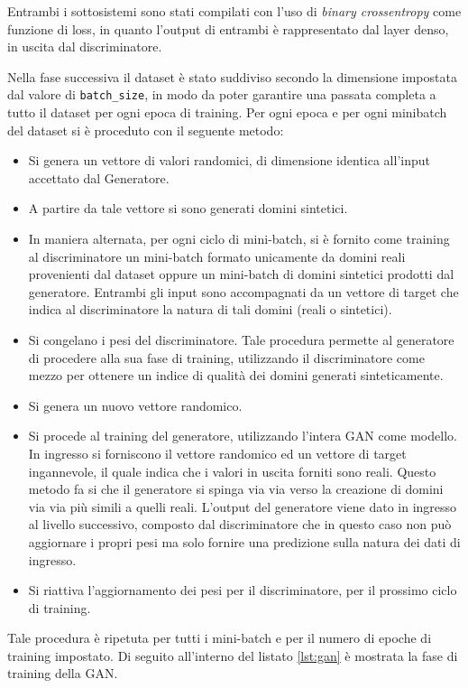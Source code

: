 Entrambi i sottosistemi sono stati compilati con l'uso di \textit{binary crossentropy} come funzione di loss, in quanto l'output di entrambi è rappresentato dal layer denso, in uscita dal discriminatore.

Nella fase successiva il dataset è stato suddiviso secondo la dimensione impostata dal valore di \lstinline!batch_size!, in modo da poter garantire una passata completa a tutto il dataset per ogni epoca di training.
Per ogni epoca e per ogni minibatch del dataset si è proceduto con il seguente metodo: 
\begin{itemize}
	\item Si genera un vettore di valori randomici, di dimensione identica all'input accettato dal Generatore. 
	\item A partire da tale vettore si sono generati domini sintetici.
	\item In maniera alternata, per ogni ciclo di mini-batch, si è fornito come training al discriminatore un mini-batch formato unicamente da domini reali provenienti dal dataset oppure un mini-batch di domini sintetici prodotti dal generatore. Entrambi gli input sono accompagnati da un vettore di target che indica al discriminatore la natura di tali domini (reali o sintetici).
	\item Si congelano i pesi del discriminatore. Tale procedura permette al generatore di procedere alla sua fase di training, utilizzando il discriminatore come mezzo per ottenere un indice di qualità dei domini generati sinteticamente.
	\item Si genera un nuovo vettore randomico.
	\item Si procede al training del generatore, utilizzando l'intera GAN come modello. In ingresso si forniscono il vettore randomico ed un vettore di target ingannevole, il quale indica che i valori in uscita forniti sono reali. Questo metodo fa si che il generatore si spinga via via verso la creazione di domini via via più simili a quelli reali. L'output del generatore viene dato in ingresso al livello successivo, composto dal discriminatore che in questo caso non può aggiornare i propri pesi ma solo fornire una predizione sulla natura dei dati di ingresso. 
	\item Si riattiva l'aggiornamento dei pesi per il discriminatore, per il prossimo ciclo di training.
\end{itemize}

Tale procedura è ripetuta per tutti i mini-batch e per il numero di epoche di training impostato. 
Di seguito all'interno del listato \ref{lst:gan} è mostrata la fase di training della GAN.

\pagebreak

